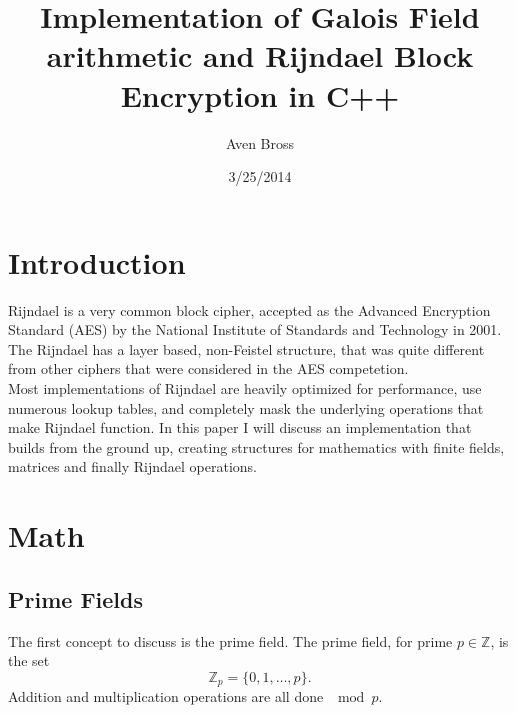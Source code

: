 \documentclass{article}
\title{Implementation of Galois Field arithmetic and Rijndael Block Encryption in C++}
\author{Aven Bross}
\date{3/25/2014}
\begin{document}
\maketitle






%
%

\section{Introduction}

Rijndael is a very common block cipher, accepted as the Advanced Encryption Standard (AES) by the National Institute of Standards and Technology in 2001.  The Rijndael has a layer based, non-Feistel structure, that was quite different from other ciphers that were considered in the AES competetion. \\
Most implementations of Rijndael are heavily optimized for performance, use numerous lookup tables, and completely mask the underlying operations that make Rijndael function.  In this paper I will discuss an implementation that builds from the ground up, creating structures for mathematics with finite fields, matrices and finally Rijndael operations.

\section{Math}

\subsection{Prime Fields}

The first concept to discuss is the prime field.  The prime field, for prime $p\in\mathbb{Z}$, is the set
\[ \mathbb{Z}_p = \{0,1,\ldots,p\}. \]
Addition and multiplication operations are all done $\mod p$.
\end{document}
